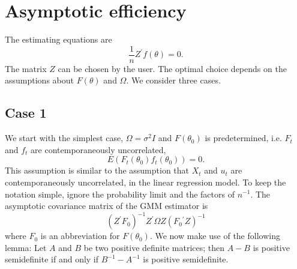 \documentclass{article}
\begin{document}
\section{Asymptotic efficiency}

The estimating equations are%
\begin{equation*}
\frac{1}{n}Z^{\prime }f(\theta )=0.
\end{equation*}%
The matrix $Z$ can be chosen by the user. The optimal choice depends on the
assumptions about $F(\theta )$ and $\Omega $. We consider three cases.

\subsection{Case 1}

We start with the simplest case, $\Omega =\sigma ^{2}I$ and $F(\theta _{0})$
is predetermined, i.e. $F_{t}$ and $f_{t}$ are contemporaneously
uncorrelated,%
\begin{equation*}
E\left( F_{t}(\theta _{0})f_{t}(\theta _{0})\right) =0.
\end{equation*}%
This assumption is similar to the assumption that $X_{t}$ and $u_{t}$ are
contemporaneously uncorrelated, in the linear regression model. To keep the
notation simple, ignore the probability limit and the factors of $n^{-1}$.
The asymptotic covariance matrix of the GMM estimator is%
\begin{equation*}
\left( Z^{\prime }F_{0}\right) ^{-1}Z^{\prime }\Omega Z\left(
F_{0}{}^{\prime }Z\right) ^{-1}
\end{equation*}%
where $F_{0}$ is an abbreviation for $F(\theta _{0})$. We now make use of
the following lemma: Let $A$ and $B$ be two positive definite matrices; then
$A-B$ is positive semidefinite if and only if $B^{-1}-A^{-1}$ is positive
semidefinite.
\end{document}
